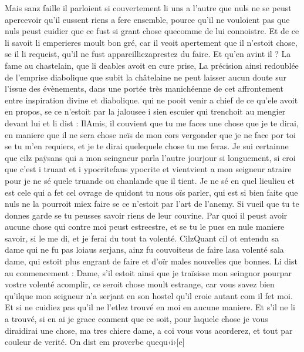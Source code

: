 \documentclass{article}
\begin{document}
\begin{pages}
   Mais sanz faille il parloient si couvertement li uns a l’autre que nuls ne se peust apercevoir qu’il eussent riens a fere ensemble,
   pource qu’il ne vouloient pas que nuls peust cuidier que ce fust si grant chose 
   quecomme de lui connoistre.
   Et de ce li savoit li emperieres moult bon gré, car il veoit apertement que il n’estoit chose, 
   se il li requeist, qu’il ne fust appareilliezaprestez du faire.
   Et qu’en avint il ? La fame au chastelain,
   que li deables avoit en cure prise, La précision ainsi redoublée de l'emprise diabolique que subit
   la châtelaine ne peut laisser aucun doute sur l'issue des évènements, dans une portée très manichéenne de cet affrontement 
   entre inspiration divine et diabolique. qui ne pooit venir a chief de ce qu’ele avoit en propos, se ce n’estoit par la jalousee 
   i sien escuier qui trenchoit au mengier devant lui et li dist :
   IlAmis, il couvient que tu me faces 
      une chose que je te dirai, en maniere que il ne sera chose neïs de mon cors vergonder que je ne face por toi se tu m’en requiers, 
      et je te dirai quelequele chose tu me feras. Je sui certainne que 
      cilz paÿsans qui a mon seingneur parla l’autre 
         jourjour si longuement,
      si croi que c’est i truant et i 
      ypocritefaus ypocrite et 
      vientvient a mon seigneur atraire 
      pour je ne sé quele truande ou chanlande que il tient. 
      Je ne sé en quel lieulieu et est cele qui a fet cel ovrage 
      de quidont tu nous oïs parler, qui est si bien faite que nuls ne la pourroit miex 
      faire se ce n’estoit par l’art de l’anemy. Si vueil que tu te donnes garde se tu peusses savoir riens de leur couvine. 
      Par quoi il peust avoir aucune chose qui contre moi peust estreestre, 
         et se tu le pues en nule maniere savoir, si le me di, et je ferai du tout ta volenté. \pend
\pstart CilzQuant cil ot entendu sa dame qui ne fu pas 
   loiaus serjans, ainz fu couvoiteus de faire lasa volenté 
   sala dame, 
   qui estoit plus engrant de faire et d’oïr males nouvelles que bonnes. Li dist au conmencement :
   Dame, s’il estoit ainsi que je traïsisse mon seingnor 
      pourpar vostre volenté acomplir, 
      ce seroit chose moult estrange, car vous savez bien qu’ilque mon seigneur 
      n’a serjant en son hostel qu’il croie autant com il fet moi. 
      Et si ne cuidiez pas qu’il ne l’etlez trouvé en moi en aucune maniere. 
      Et s’il ne li a trouvé, si en ai je grace conment que ce soit, pour laquele chose 
      je vous diraidirai une chose, ma tres chiere dame, a coi vous vous acorderez, 
      et tout par couleur de verité. On dist em proverbe quequ‹i›[e] 

\end{pages}
\end{document}
